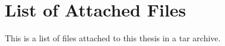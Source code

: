 \chapter{List of Attached Files}
\label{chap:files}

This is a list of files attached to this thesis in a tar archive.

\medskip
{}
